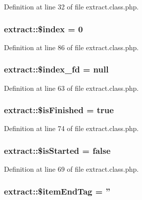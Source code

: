 Definition at line 32 of file extract.\-class.\-php.

\hypertarget{classextract_a167ca671b16d1b95eef76886f6d91a0c}{
\subsubsection[{\$index}]{\setlength{\rightskip}{0pt plus 5cm}extract\-::\$index = 0}}\label{classextract_a167ca671b16d1b95eef76886f6d91a0c}


Definition at line 86 of file extract.\-class.\-php.

\hypertarget{classextract_a6805ee81f498cae226d90b8fa9ecba88}{
\subsubsection[{\$index\-\_\-fd}]{\setlength{\rightskip}{0pt plus 5cm}extract\-::\$index\-\_\-fd = null}}\label{classextract_a6805ee81f498cae226d90b8fa9ecba88}


Definition at line 63 of file extract.\-class.\-php.

\hypertarget{classextract_a0962c888279f7c5d551d3fdf1af1ee4c}{
\subsubsection[{\$is\-Finished}]{\setlength{\rightskip}{0pt plus 5cm}extract\-::\$is\-Finished = true}}\label{classextract_a0962c888279f7c5d551d3fdf1af1ee4c}


Definition at line 74 of file extract.\-class.\-php.

\hypertarget{classextract_a609fc88642ae3bf1e27f0232f1b21171}{
\subsubsection[{\$is\-Started}]{\setlength{\rightskip}{0pt plus 5cm}extract\-::\$is\-Started = false}}\label{classextract_a609fc88642ae3bf1e27f0232f1b21171}


Definition at line 69 of file extract.\-class.\-php.

\hypertarget{classextract_abddb079afc9c7c2f210e7793b93388e5}{
\subsubsection[{\$item\-End\-Tag}]{\setlength{\rightskip}{0pt plus 5cm}extract\-::\$item\-End\-Tag = ''}}\label{classextract_abddb079afc9c7c2f210e7793b93388e5}


